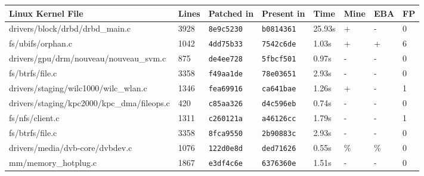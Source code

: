 \begin{table}[H]
    \centering
    \setlength{\tabcolsep}{5pt}
    \renewcommand{\arraystretch}{1.25}
    \scriptsize
    \begin{tabular}{llllllll}
    \textbf{Linux Kernel File}                    & \textbf{Lines} & \textbf{Patched in} & \textbf{Present in} & \textbf{Time} & \textbf{Mine} & \textbf{EBA} & \textbf{FP} \\
    \hline
    drivers/block/drbd/drbd\_main.c               & 3928           & \texttt{8e9c5230}   & \texttt{b0814361}   & 25.93s        & +             & -            & 0           \\
    fs/ubifs/orphan.c                             & 1042           & \texttt{4dd75b33}   & \texttt{7542c6de}   & 1.03s         & +             & +            & 6           \\
    drivers/gpu/drm/nouveau/nouveau\_svm.c        & 875            & \texttt{de4ee728}   & \texttt{5fbcf501}   & 0.97s         & -             & -            & 0           \\
    fs/btrfs/file.c                               & 3358           & \texttt{f49aa1de}   & \texttt{78e03651}   & 2.93s         & -             & -            & 0           \\
    drivers/staging/wilc1000/wilc\_wlan.c         & 1346           & \texttt{fea69916}   & \texttt{ca641bae}   & 1.26s         & +             & -            & 1           \\
    drivers/staging/kpc2000/kpc\_dma/fileops.c    & 420            & \texttt{c85aa326}   & \texttt{d4c596eb}   & 0.74s         & -             & -            & 0           \\
    fs/nfs/client.c                               & 1311           & \texttt{c260121a}   & \texttt{a46126cc}   & 1.79s         & -             & -            & 1           \\
    fs/btrfs/file.c                               & 3358           & \texttt{8fca9550}   & \texttt{2b90883c}   & 2.93s         & -             & -            & 0           \\
    drivers/media/dvb-core/dvbdev.c               & 1076           & \texttt{122d0e8d}   & \texttt{ded71626}   & 0.55s         & \%            & \%           & 0           \\
    mm/memory\_hotplug.c                          & 1867           & \texttt{e3df4c6e}   & \texttt{6376360e}   & 1.51s         & -             & -            & 0           \\

\end{tabular}
\end{table}

